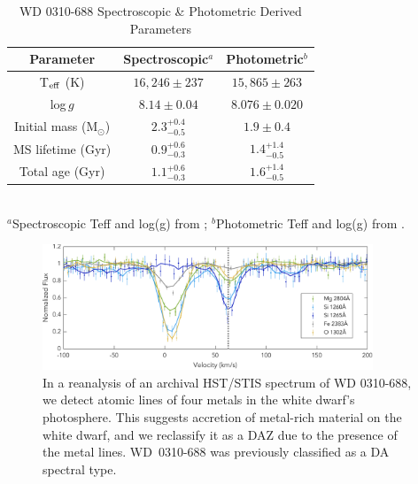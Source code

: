 \documentclass[twocolumn]{aastex631}
\begin{document}
\begin{table}
\centering
\caption{WD 0310-688 Spectroscopic \& Photometric Derived Parameters}
\vspace{-3mm}
\label{tab:parameters}
\begin{tabular}{c|c|c}
Parameter & Spectroscopic$^a$ & Photometric$^b$ \\ 
\hline 
T$_{\rm eff}$ (K) & $16,246 \pm 237$ & $15,865 \pm 263$ \\
log\,$g$ & $8.14 \pm 0.04$ & $8.076 \pm 0.020$ \\
Initial mass (M$_\odot$) & $2.3_{-0.5}^{+0.4}$ & $1.9 \pm 0.4$ \\
MS lifetime (Gyr) & $0.9_{-0.3}^{+0.6}$ & $1.4_{-0.5}^{+1.4}$ \\
Total age (Gyr) & $1.1_{-0.3}^{+0.6}$ & $1.6_{-0.5}^{+1.4}$ \\ 
\end{tabular}
\\
\vspace{1mm}
{\footnotesize $^a$Spectroscopic Teff and log(g) from  \citealt{2017ApJ...848...11B}; $^b$Photometric Teff and log(g) from \citealt{2021MNRAS.508.3877G}.}
\end{table}



\begin{figure}
\centering
\includegraphics[width=0.88\textwidth]{Figures/STISlinesV2.pdf}
\caption{In a reanalysis of an archival HST/STIS spectrum of WD 0310-688, we detect atomic lines of four metals in the white dwarf's photosphere. This suggests accretion of metal-rich material on the white dwarf, and we reclassify it as a DAZ due to the presence of the metal lines. WD~0310-688 was previously classified as a DA spectral type.}
\label{STISspectrum}
\end{figure}

 
\end{document}
